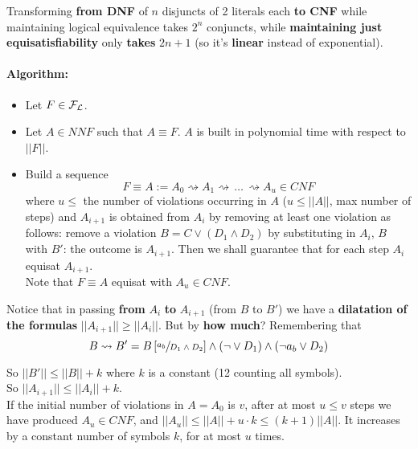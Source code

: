 	Transforming \textbf{from DNF} of $n$ disjuncts of 2 literals each \textbf{to CNF} while maintaining logical equivalence takes $2^n$ conjuncts, while \textbf{maintaining just equisatisfiability} only \textbf{takes} $2n+1$ (so it's \textbf{linear} instead of exponential).\\

	\paragraph{Algorithm:}
	\begin{itemize}
		\item Let $F \in \mathcal{F}_\mathcal{L}$.\\

		\item Let $A \in NNF$ such that $A \equiv F$. $A$ is built in polynomial time with respect to $||F||$.\\

		\item Build a sequence
		$$ F \equiv A := A_0 \rightsquigarrow A_1 \rightsquigarrow\, \dots \, \rightsquigarrow A_u \in CNF $$
		where $u \leq$ the number of violations occurring in $A$ ($u \leq ||A||$, max number of steps) and $A_{i+1}$ is obtained from $A_i$ by removing at least one violation as follows: remove a violation $B = C \vee (D_1 \wedge D_2)$ by substituting in $A_i$, $B$ with $B'$: the outcome is $A_{i+1}$. Then we shall guarantee that for each step $A_i$ equisat $A_{i+1}$. \\
		Note that $F \equiv A$ equisat with $A_u \in CNF$.\\
	\end{itemize}

	\newpage

	Notice that in passing \textbf{from} $A_i$ \textbf{to} $A_{i+1}$ (from $B$ to $B'$) we have a \textbf{dilatation of the formulas} $||A_{i+1}|| \geq ||A_i||$. But by \textbf{how much}? Remembering that
	$$ B \rightsquigarrow B' = B \left[\sfrac{a_b}{D_1 \wedge D_2}\right] \wedge (\neg \vee D_1) \wedge (\neg a_b \vee D_2) $$

	So $||B'|| \leq ||B|| + k$ where $k$ is a constant (12 counting all symbols).\\
	So $||A_{i+1}|| \leq ||A_i|| + k$.\\

	If the initial number of violations in $A=A_0$ is $v$, after at most $u \leq v$ steps we have produced $A_u \in CNF$, and $||A_u|| \leq ||A|| + u \cdot k \leq (k+1) ||A||$. It increases by a constant number of symbols $k$, for at most $u$ times.\\

